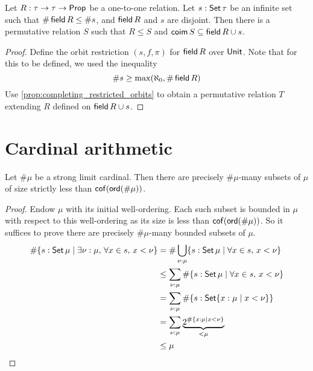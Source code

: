 \begin{proposition}
  \label{prop:completing_orbits}
  Let \( R : \tau \to \tau \to \mathsf{Prop} \) be a one-to-one relation.
  Let \( s : \operatorname{\mathsf{Set}} \tau \) be an infinite set such that \( \#\operatorname{\mathsf{field}} R \leq \#s \), and \( \operatorname{\mathsf{field}} R \) and \( s \) are disjoint.
  Then there is a permutative relation \( S \) such that \( R \leq S \) and \( \operatorname{\mathsf{coim}} S \subseteq \operatorname{\mathsf{field}} R \cup s \).
\end{proposition}
\begin{proof}
  Define the orbit restriction \( (s, f, \pi) \) for \( \operatorname{\mathsf{field}} R \) over \( \mathsf{Unit} \).
  Note that for this to be defined, we used the inequality
  \[ \#s \geq \max(\aleph_0, \#\operatorname{\mathsf{field}} R) \]
  Use \cref{prop:completing_restricted_orbits} to obtain a permutative relation \( T \) extending \( R \) defined on \( \operatorname{\mathsf{field}} R \cup s \).
\end{proof}

\section{Cardinal arithmetic}

\begin{lemma}[mathlib]
  \label{prop:card_subset_card_lt_cof}
  Let \( \#\mu \) be a strong limit cardinal.
  Then there are precisely \( \#\mu \)-many subsets of \( \mu \) of size strictly less than \( \operatorname{\mathsf{cof}}(\operatorname{\mathsf{ord}}(\#\mu)) \).
\end{lemma}
\begin{proof}
  Endow \( \mu \) with its initial well-ordering.
  Each such subset is bounded in \( \mu \) with respect to this well-ordering as its size is less than \( \operatorname{\mathsf{cof}}(\operatorname{\mathsf{ord}}(\#\mu)) \).
  So it suffices to prove there are precisely \( \#\mu \)-many bounded subsets of \( \mu \).
  \begin{align*}
    \#\{ s : \operatorname{\mathsf{Set}} \mu \mid \exists \nu : \mu,\, \forall x \in s,\, x < \nu \}
    &= \#\bigcup_{\nu : \mu} \{ s : \operatorname{\mathsf{Set}} \mu \mid \forall x \in s,\, x < \nu \} \\
    &\leq \sum_{\nu : \mu} \#\{ s : \operatorname{\mathsf{Set}} \mu \mid \forall x \in s,\, x < \nu \} \\
    &= \sum_{\nu : \mu} \#\{ s : \operatorname{\mathsf{Set}} \{ x : \mu \mid x < \nu \}\} \\
    &= \sum_{\nu : \mu} \underbrace{2^{\#\{ x : \mu \mid x < \nu \}}}_{<\mu} \\
    &\leq \mu
  \end{align*}
\end{proof}
